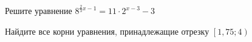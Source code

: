 \begin{ex}
	\begin{condition}
		\begin{enumcols}[label=\asbuk*)]
			\item Решите уравнение \( 8^{\tfrac{2}{3}x - 1} =  11\cdot 2^{x -3}-3 \)
			\item Найдите все корни уравнения, принадлежащие отрезку \( \left[1,75;4\right) \)
		\end{enumcols}
	\end{condition}
\end{ex}